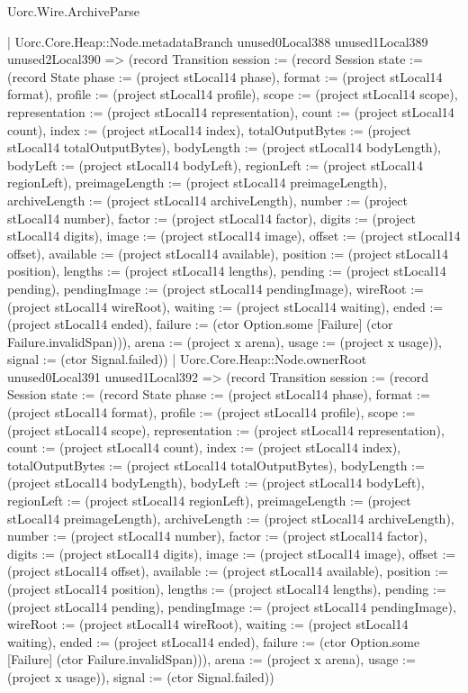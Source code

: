 \begin{lexlean}{Uorc.Wire.ArchiveParse}
\begin{semanticmodule}
{            | Uorc.Core.Heap::Node.metadataBranch unused0Local388 unused1Local389 unused2Local390 => (record Transition {session := (record Session {state := (record State {phase := (project stLocal14 phase), format := (project stLocal14 format), profile := (project stLocal14 profile), scope := (project stLocal14 scope), representation := (project stLocal14 representation), count := (project stLocal14 count), index := (project stLocal14 index), totalOutputBytes := (project stLocal14 totalOutputBytes), bodyLength := (project stLocal14 bodyLength), bodyLeft := (project stLocal14 bodyLeft), regionLeft := (project stLocal14 regionLeft), preimageLength := (project stLocal14 preimageLength), archiveLength := (project stLocal14 archiveLength), number := (project stLocal14 number), factor := (project stLocal14 factor), digits := (project stLocal14 digits), image := (project stLocal14 image), offset := (project stLocal14 offset), available := (project stLocal14 available), position := (project stLocal14 position), lengths := (project stLocal14 lengths), pending := (project stLocal14 pending), pendingImage := (project stLocal14 pendingImage), wireRoot := (project stLocal14 wireRoot), waiting := (project stLocal14 waiting), ended := (project stLocal14 ended), failure := (ctor Option.some [Failure] (ctor Failure.invalidSpan))}), arena := (project x arena), usage := (project x usage)}), signal := (ctor Signal.failed)})
            | Uorc.Core.Heap::Node.ownerRoot unused0Local391 unused1Local392 => (record Transition {session := (record Session {state := (record State {phase := (project stLocal14 phase), format := (project stLocal14 format), profile := (project stLocal14 profile), scope := (project stLocal14 scope), representation := (project stLocal14 representation), count := (project stLocal14 count), index := (project stLocal14 index), totalOutputBytes := (project stLocal14 totalOutputBytes), bodyLength := (project stLocal14 bodyLength), bodyLeft := (project stLocal14 bodyLeft), regionLeft := (project stLocal14 regionLeft), preimageLength := (project stLocal14 preimageLength), archiveLength := (project stLocal14 archiveLength), number := (project stLocal14 number), factor := (project stLocal14 factor), digits := (project stLocal14 digits), image := (project stLocal14 image), offset := (project stLocal14 offset), available := (project stLocal14 available), position := (project stLocal14 position), lengths := (project stLocal14 lengths), pending := (project stLocal14 pending), pendingImage := (project stLocal14 pendingImage), wireRoot := (project stLocal14 wireRoot), waiting := (project stLocal14 waiting), ended := (project stLocal14 ended), failure := (ctor Option.some [Failure] (ctor Failure.invalidSpan))}), arena := (project x arena), usage := (project x usage)}), signal := (ctor Signal.failed)})
}
\end{semanticmodule}
\end{lexlean}
